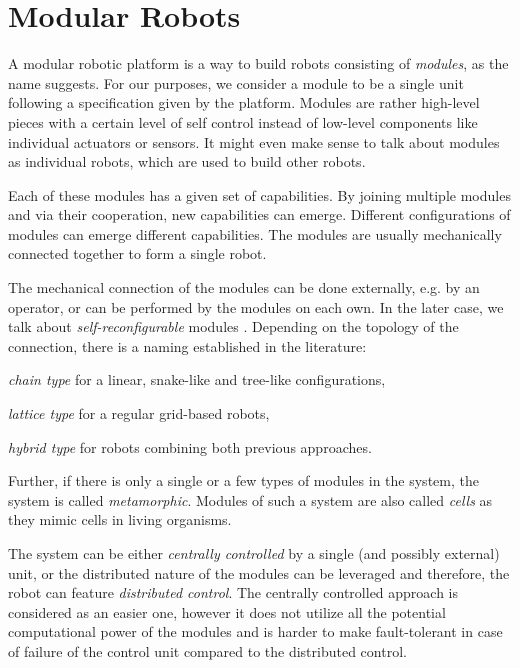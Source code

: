 \section{Modular Robots}

A modular robotic platform is a way to build robots consisting of
\emph{modules}, as the name suggests. For our purposes, we consider a module to
be a single unit following a specification given by the platform. Modules are
rather high-level pieces with a certain level of self control instead of
low-level components like individual actuators or sensors. It might even make
sense to talk about modules as individual robots, which are used to build other
robots\cite{brunete_current_2017}.

Each of these modules has a given set of capabilities. By joining multiple
modules and via their cooperation, new capabilities can emerge. Different
configurations of modules can emerge different capabilities. The modules are
usually mechanically connected together to form a single robot.

The mechanical connection of the modules can be done externally, e.g. by an
operator, or can be performed by the modules on each own. In the later case, we
talk about \emph{self-reconfigurable} modules \cite{brunete_current_2017}.
Depending on the topology of the connection, there is a naming established in
the literature\cite{brunete_current_2017}:
\begin{enumerate*}
    \item \emph{chain type} for a linear, snake-like and tree-like
    configurations,
    \item \emph{lattice type} for a regular grid-based robots,
    \item \emph{hybrid type} for robots combining both previous approaches.
\end{enumerate*}
Further, if there is only a single or a few types of modules in the system, the
system is called \emph{metamorphic}\cite{brunete_current_2017}. Modules of such
a system are also called \emph{cells} as they mimic cells in living organisms.

The system can be either \emph{centrally controlled} by a single (and possibly
external) unit, or the distributed nature of the modules can be leveraged and
therefore, the robot can feature \emph{distributed control}. The centrally
controlled approach is considered as an easier one, however it does not utilize
all the potential computational power of the modules and is harder to make
fault-tolerant in case of failure of the control unit compared to the
distributed control.

